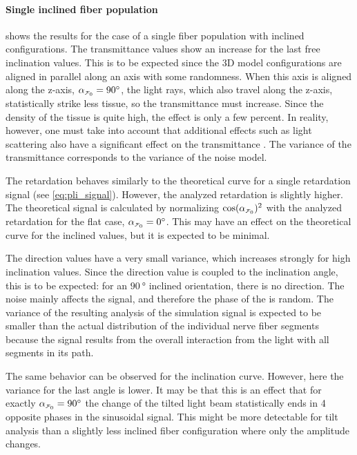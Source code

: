 \paragraph{Single inclined fiber population}
 shows the results for the case of a single fiber population with inclined configurations.
The transmittance values show an increase for the last free inclination values.
This is to be expected since the 3D model configurations are aligned in parallel along an axis with some randomness.
When this axis is aligned along the z-axis, \ie{} $\modelInc=\SI{90}{\degree}$, the light rays, which also travel along the z-axis, statistically strike less tissue, so the transmittance must increase.
Since the density of the tissue is quite high, the effect is only a few percent.
In reality, however, one must take into account that additional effects such as light scattering also have a significant effect on the transmittance \cite{Menzel2021}.
The variance of the transmittance corresponds to the variance of the noise model.
\par
%
The retardation behaves similarly to the theoretical curve for a single retardation signal (see \cref{eq:pli_signal}).
However, the analyzed retardation is slightly higher.
The theoretical signal is calculated by normalizing $\cos(\modelInc)^2$ with the analyzed retardation for the flat case, \ie{} $\modelInc = \SI{0}{\degree}$.
This may have an effect on the theoretical curve for the inclined values, but it is expected to be minimal.
\par
%
The direction values have a very small variance, which increases strongly for high inclination values.
Since the direction value is coupled to the inclination angle, this is to be expected: for an $\SI{90}{\degree}$ inclined orientation, there is no direction.
The noise mainly affects the signal, and therefore the phase of the  is random.
The variance of the resulting analysis of the simulation signal is expected to be smaller than the actual distribution of the individual nerve fiber segments because the signal results from the overall interaction from the light with all segments in its path.
\par
%
The same behavior can be observed for the inclination curve.
However, here the variance for the last angle is lower.
It may be that this is an effect that for exactly $\modelInc=\SI{90}{\degree}$ the change of the tilted light beam statistically ends in 4 opposite phases in the sinusoidal signal.
This might be more detectable for tilt analysis than a slightly less inclined fiber configuration where only the amplitude changes.
